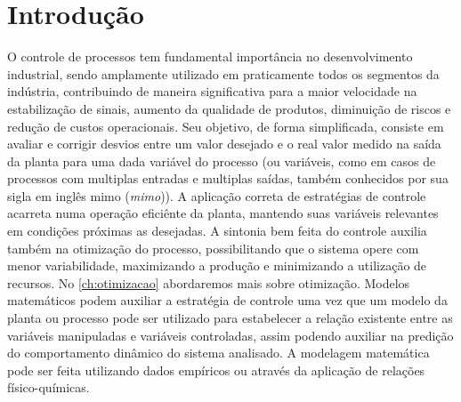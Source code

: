 \chapter{Introdução}
\label{ch:introducao}

O controle de processos tem fundamental importância no desenvolvimento industrial,
sendo amplamente utilizado em praticamente todos os segmentos da indústria,
contribuindo de maneira significativa para a maior velocidade na estabilização de sinais,
aumento da qualidade de produtos, diminuição de riscos e redução de custos operacionais.
Seu objetivo, de forma simplificada, consiste em avaliar e corrigir desvios entre um
valor desejado e o real valor medido na saída da planta para uma dada variável do
processo (ou variáveis, como em casos de processos com multiplas entradas e multiplas
saídas, também conhecidos por sua sigla em inglês \acrshort{mimo} (\textit{\acrlong{mimo}})).
A aplicação correta de estratégias de controle acarreta numa operação eficiênte da
planta, mantendo suas variáveis relevantes em condições próximas as desejadas.
A sintonia bem feita do controle auxilia também na otimização do processo,
possibilitando que o sistema opere com menor variabilidade, maximizando a produção
e minimizando a utilização de recursos. No \cref{ch:otimizacao} abordaremos mais
sobre otimização.
Modelos matemáticos podem auxiliar a estratégia de controle uma vez que um modelo da
planta ou processo pode ser utilizado para estabelecer a relação existente entre as
variáveis manipuladas e variáveis controladas, assim podendo auxiliar na predição do
comportamento dinâmico do sistema analisado. A modelagem matemática pode ser feita
utilizando dados empíricos ou através da aplicação de relações físico-químicas.

